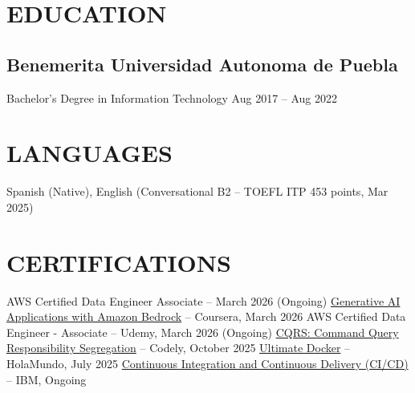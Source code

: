\documentclass[a4paper,10pt]{article}
\begin{document}
\section*{EDUCATION}

\subsection*{\small Benemerita Universidad Autonoma de Puebla}
Bachelor's Degree in Information Technology \hfill Aug 2017 -- Aug 2022

\section*{LANGUAGES}
Spanish (Native), English (Conversational B2 -- TOEFL ITP 453 points, Mar 2025)

\section*{CERTIFICATIONS}
AWS Certified Data Engineer Associate -- March 2026 (Ongoing)
\hyperlink{https://coursera.org/verify/HEG7YFDO6D1C}{Generative AI Applications with Amazon Bedrock} -- Coursera, March 2026
AWS Certified Data Engineer - Associate -- Udemy, March 2026 (Ongoing)
\hyperlink{https://www.linkedin.com/in/jose-carlos-huerta-garcia-773952212/details/certifications}{CQRS: Command Query Responsibility Segregation} -- Codely, October 2025
\hyperlink{https://academia.holamundo.io/certificates/fifvbfywmp}{Ultimate Docker} -- HolaMundo, July 2025
\hyperlink{https://www.coursera.org/programs/knu-high-o3k80/learn/continuous-integration-and-continuous-delivery-ci-cd?source=search}{Continuous Integration and Continuous Delivery (CI/CD)} -- IBM, Ongoing
\end{document}
